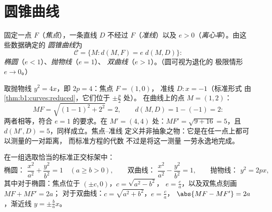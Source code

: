 \section{圆锥曲线}

\begin{definition}[焦点--准线定义]\label{def:b1:curves:conics}
固定一点 $F$（\emph{焦点}），一条直线 $D$
不经过 $F$（\emph{准线}）以及 $e > 0$（\emph{离心率}）。由这些数据确定的
\emph{圆锥曲线}为
\[
\mathcal{C} = \{M : d(M, F) = e\; d(M, D)\}:
\]
\emph{椭圆}（$e < 1$）、\emph{抛物线}（$e = 1$）、
\emph{双曲线}（$e > 1$）。（圆可视为退化的
极限情形 $e \to 0$。）
\end{definition}

\begin{example}[在抛物线上检验定义]
\label{ex:b1:curves:parabolacheck}
取抛物线 $y^2 = 4x$，即 $2p = 4$：焦点 $F = (1, 0)$，
准线 $D : x = -1$（标准形式
由\cref{thm:b1:curves:reduced}，它们位于 $\pm\frac p2$ 处）。
在曲线上的点 $M = (1, 2)$：
\[
MF = \sqrt{(1-1)^2 + 2^2} = 2,
\qquad
d(M, D) = 1 - (-1) = 2 :
\]
两者相等，符合 $e = 1$ 的要求。在 $M' = (4, 4)$ 处：$MF' = \sqrt{9 +
16} = 5$，且 $d(M', D) = 5$，同样成立。焦点--准线
定义并非抽象之物：它是在任一点上都可以测量的一对距离，
而标准方程的代数
不过是将这一测量
一劳永逸地完成。
\end{example}

\begin{theorem}[标准方程]\label{thm:b1:curves:reduced}
在一组选取恰当的标准正交标架中：
\[
\text{椭圆： } \frac{x^2}{a^2} + \frac{y^2}{b^2} = 1
\quad (a \geq b > 0),
\qquad
\text{双曲线： } \frac{x^2}{a^2} - \frac{y^2}{b^2} = 1,
\qquad
\text{抛物线： } y^2 = 2px,
\]
其中对于椭圆：焦点位于 $(\pm c, 0)$，$c = \sqrt{a^2 - b^2}$，
$e = \frac ca$，以及双焦点刻画 $MF + MF' = 2a$；
对于双曲线：$c = \sqrt{a^2 + b^2}$，$e = \frac ca$，
$\abs{MF - MF'} = 2a$，渐近线 $y = \pm\frac ba x$。
\end{theorem}

